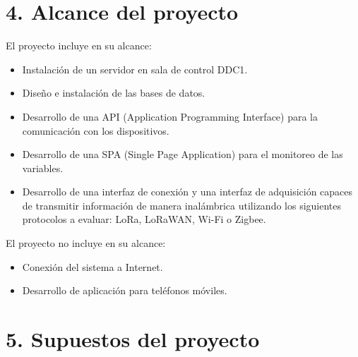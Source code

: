 \documentclass[
11pt%
]{charter}
\begin{document}



\section{4. Alcance del proyecto}
\label{sec:alcance}


El proyecto incluye en su alcance:
\begin{itemize} 
	\item Instalación de un servidor en sala de control DDC1.
	\item Diseño e instalación de las bases de datos.
	\item Desarrollo de una API (Application Programming Interface) para la comunicación con los dispositivos.
	\item Desarrollo de una SPA (Single Page Application) para el monitoreo de las variables.
	\item Desarrollo de una interfaz de conexión y una interfaz de adquisición capaces de transmitir información de manera inalámbrica utilizando los siguientes protocolos a evaluar: LoRa, LoRaWAN, Wi-Fi o Zigbee.
	
\end{itemize}

El proyecto no incluye en su alcance:
\begin{itemize}
	\item Conexión del sistema a Internet.
	\item Desarrollo de aplicación para teléfonos móviles.
\end{itemize}




\section{5. Supuestos del proyecto}
\label{sec:supuestos}
\end{document}
